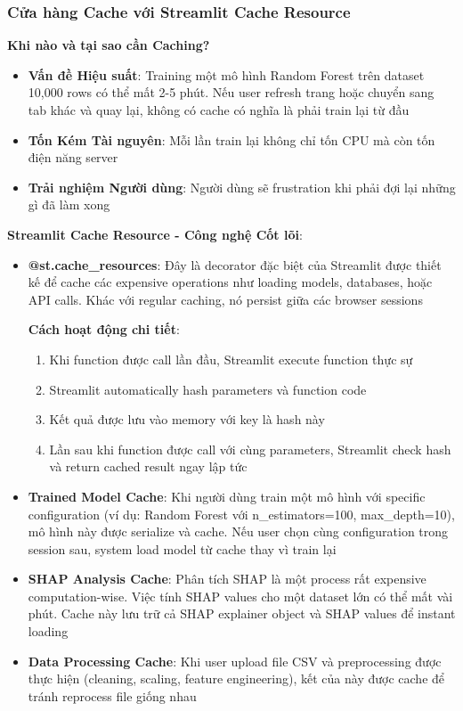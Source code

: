 \subsubsection{Cửa hàng Cache với Streamlit Cache Resource}

\textbf{Khi nào và tại sao cần Caching?}
\begin{itemize}[leftmargin=*]
    \item \textbf{Vấn đề Hiệu suất}: Training một mô hình Random Forest trên dataset 10,000 rows có thể mất 2-5 phút. Nếu user refresh trang hoặc chuyển sang tab khác và quay lại, không có cache có nghĩa là phải train lại từ đầu
    \item \textbf{Tốn Kém Tài nguyên}: Mỗi lần train lại không chỉ tốn CPU mà còn tốn điện năng server
    \item \textbf{Trải nghiệm Người dùng}: Người dùng sẽ frustration khi phải đợi lại những gì đã làm xong
\end{itemize}

\textbf{Streamlit Cache Resource - Công nghệ Cốt lõi}:
\begin{itemize}[leftmargin=*]
    \item \textbf{@st.cache\_resources}: Đây là decorator đặc biệt của Streamlit được thiết kế để cache các expensive operations như loading models, databases, hoặc API calls. Khác với regular caching, nó persist giữa các browser sessions
    
    \textbf{Cách hoạt động chi tiết}:
    \begin{enumerate}[leftmargin=*]
        \item Khi function được call lần đầu, Streamlit execute function thực sự
        \item Streamlit automatically hash parameters và function code
        \item Kết quả được lưu vào memory với key là hash này
        \item Lần sau khi function được call với cùng parameters, Streamlit check hash và return cached result ngay lập tức
    \end{enumerate}
    
    \item \textbf{Trained Model Cache}: Khi người dùng train một mô hình với specific configuration (ví dụ: Random Forest với n\_estimators=100, max\_depth=10), mô hình này được serialize và cache. Nếu user chọn cùng configuration trong session sau, system load model từ cache thay vì train lại
    
    \item \textbf{SHAP Analysis Cache}: Phân tích SHAP là một process rất expensive computation-wise. Việc tính SHAP values cho một dataset lớn có thể mất vài phút. Cache này lưu trữ cả SHAP explainer object và SHAP values để instant loading
    
    \item \textbf{Data Processing Cache}: Khi user upload file CSV và preprocessing được thực hiện (cleaning, scaling, feature engineering), kết của này được cache để tránh reprocess file giống nhau
\end{itemize}

